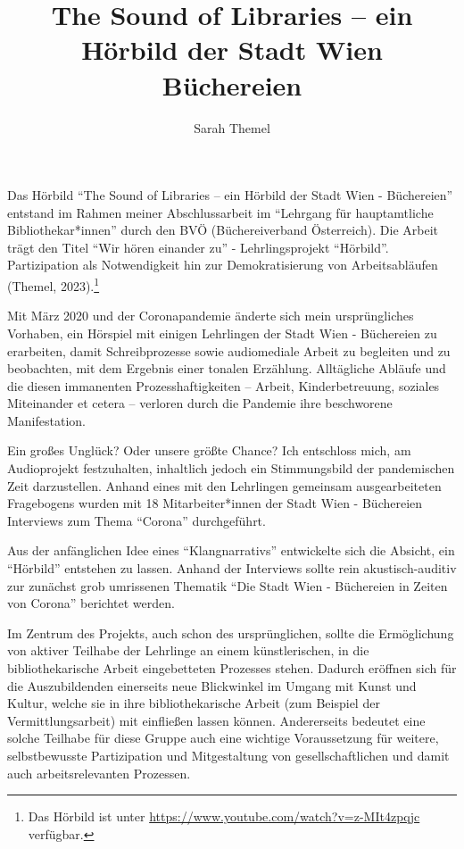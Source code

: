 \documentclass[a4paper,
fontsize=11pt,
oneside,
numbers=noperiodatend,
parskip=half-,
bibliography=totoc,
final
]{scrartcl}
\title{\LARGE{The Sound of Libraries -- ein Hörbild der Stadt Wien Büchereien}}%
\author{Sarah Themel} %
\date{}
\begin{document}
\maketitle
\thispagestyle{fancyplain} 


Das Hörbild \enquote{The Sound of Libraries -- ein Hörbild der Stadt
Wien - Büchereien} entstand im Rahmen meiner Abschlussarbeit im
\enquote{Lehrgang für hauptamtliche Bibliothekar*innen} durch den BVÖ
(Büchereiverband Österreich). Die Arbeit trägt den Titel \enquote{Wir
hören einander zu} - Lehrlingsprojekt \enquote{Hörbild}. Partizipation
als Notwendigkeit hin zur Demokratisierung von Arbeitsabläufen (Themel,
2023).\footnote{Das Hörbild ist unter \url{https://www.youtube.com/watch?v=z-MIt4zpqjc} verfügbar.}

Mit März 2020 und der Coronapandemie änderte sich mein ursprüngliches
Vorhaben, ein Hörspiel mit einigen Lehrlingen der Stadt Wien -
Büchereien zu erarbeiten, damit Schreibprozesse sowie audiomediale
Arbeit zu begleiten und zu beobachten, mit dem Ergebnis einer tonalen
Erzählung. Alltägliche Abläufe und die diesen immanenten
Prozesshaftigkeiten -- Arbeit, Kinderbetreuung, soziales Miteinander et
cetera -- verloren durch die Pandemie ihre beschworene Manifestation.

Ein großes Unglück? Oder unsere größte Chance? Ich entschloss mich, am
Audioprojekt festzuhalten, inhaltlich jedoch ein Stimmungsbild der
pandemischen Zeit darzustellen. Anhand eines mit den Lehrlingen
gemeinsam ausgearbeiteten Fragebogens wurden mit 18 Mitarbeiter*innen
der Stadt Wien - Büchereien Interviews zum Thema \enquote{Corona}
durchgeführt.

Aus der anfänglichen Idee eines \enquote{Klangnarrativs} entwickelte
sich die Absicht, ein \enquote{Hörbild} entstehen zu lassen. Anhand der
Interviews sollte rein akustisch-auditiv zur zunächst grob umrissenen
Thematik \enquote{Die Stadt Wien - Büchereien in Zeiten von Corona}
berichtet werden.

Im Zentrum des Projekts, auch schon des ursprünglichen, sollte die
Ermöglichung von aktiver Teilhabe der Lehrlinge an einem künstlerischen,
in die bibliothekarische Arbeit eingebetteten Prozesses stehen. Dadurch
eröffnen sich für die Auszubildenden einerseits neue Blickwinkel im
Umgang mit Kunst und Kultur, welche sie in ihre bibliothekarische Arbeit
(zum Beispiel der Vermittlungsarbeit) mit einfließen lassen können.
Andererseits bedeutet eine solche Teilhabe für diese Gruppe auch eine
wichtige Voraussetzung für weitere, selbstbewusste Partizipation und
Mitgestaltung von gesellschaftlichen und damit auch arbeitsrelevanten
Prozessen.
\end{document}
